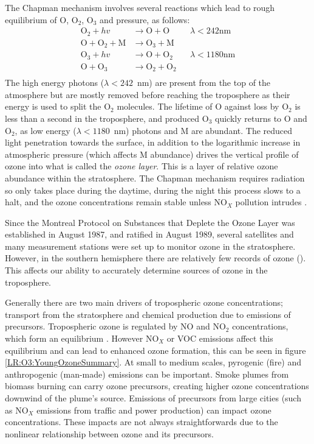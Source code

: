   The Chapman mechanism involves several reactions which lead to rough equilibrium of O, O$_2$, O$_3$ and pressure, as follows:
  \begin{equation}
    \begin{aligned}
      \text{O}_2 + hv              & \to \text{O}+\text{O}     && \lambda < 242 \text{nm} \\
      \text{O}+\text{O}_2+\text{M} & \to \text{O}_3+\text{M}   &&    \\
      \text{O}_3 + hv              & \to \text{O}+\text{O}_2   && \lambda < 1180 \text{nm} \\
      \text{O} + \text{O}_3        & \to \text{O}_2+\text{O}_2 &&       \\
    \end{aligned}
    \label{LR:O3:eqn_Chapman}
  \end{equation}
  The high energy photons ($\lambda < 242$~nm) are present from the top of the atmosphere but are mostly removed before reaching the troposphere as their energy is used to split the O$_2$ molecules.
  The lifetime of O against loss by O$_2$ is less than a second in the troposphere, and produced O$_3$ quickly returns to O and O$_2$, as low energy ($\lambda < 1180$~nm) photons and M are abundant.
  The reduced light penetration towards the surface, in addition to the logarithmic increase in atmospheric pressure (which affects M abundance) drives the vertical profile of ozone into what is called the \textit{ozone layer}.
  This is a layer of relative ozone abundance within the stratosphere.
  The Chapman mechanism requires radiation so only takes place during the daytime, during the night this process slows to a halt, and the ozone concentrations remain stable unless NO$_X$ pollution intrudes \citep[Chapter 10]{Jacob_1999_book}.
  
  
  Since the Montreal Protocol on Substances that Deplete the Ozone Layer was established in August 1987, and ratified in August 1989, several satellites and many measurement stations were set up to monitor ozone in the stratosphere.
  However, in the southern hemisphere there are relatively few records of ozone (\cite{Huang2017}).
  This affects our ability to accurately determine sources of ozone in the troposphere.
  
  
  Generally there are two main drivers of tropospheric ozone concentrations; transport from the stratosphere and chemical production due to emissions of precursors. 
  Tropospheric ozone is regulated by NO and NO$_2$ concentrations, which form an equilibrium \citep{Cape2008,Young2018}.
  However NO$_X$ or VOC emissions affect this equilibrium and can lead to enhanced ozone formation, this can be seen in figure \ref{LR:O3:YoungOzoneSummary}.
  At small to medium scales, pyrogenic (fire) and anthropogenic (man-made) emissions can be important.
  Smoke plumes from biomass burning can carry ozone precursors, creating higher ozone concentrations downwind of the plume's source.
  Emissions of precursors from large cities (such as NO$_X$ emissions from traffic and power production) can impact ozone concentrations.
  These impacts are not always straightforwards due to the nonlinear relationship between ozone and its precursors.
  
